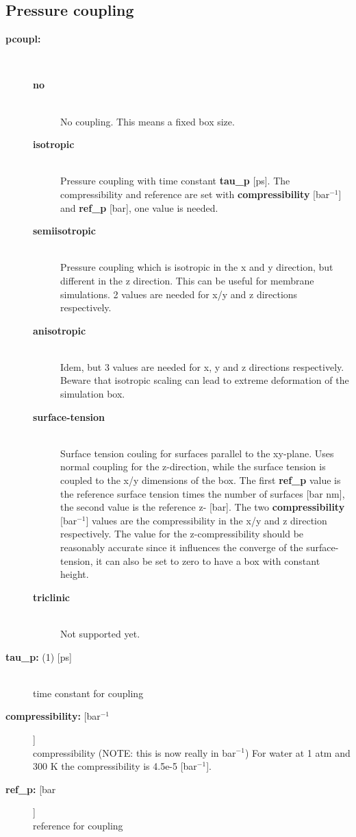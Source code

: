 \subsection{Pressure coupling}
\begin{description}
\item[{\bf pcoupl:}]\mbox{}\\
\vspace{-2ex}\begin{description}
\item[{\bf no}]\mbox{}\\
No  coupling. This means a fixed box size.
\item[{\bf isotropic}]\mbox{}\\
Pressure coupling with time constant {\bf tau\_p} [ps].
The compressibility and reference  are set with
{\bf compressibility} [bar$^{-1}$] and {\bf ref\_p} [bar], one
value is needed.
\item[{\bf semiisotropic}]\mbox{}\\
Pressure coupling which is isotropic in the x and y direction,
but different in the z direction.
This can be useful for membrane simulations.
2 values are needed for x/y and z directions respectively.
\item[{\bf anisotropic}]\mbox{}\\
Idem, but 3 values are needed for x, y and z directions respectively.
Beware that isotropic scaling can lead to extreme deformation
of the simulation box.
\item[{\bf surface-tension}]\mbox{}\\
Surface tension couling for surfaces parallel to the xy-plane.
Uses normal  coupling for the z-direction, while the surface tension
is coupled to the x/y dimensions of the box.
The first {\bf ref\_p} value is the reference surface tension times
the number of surfaces [bar nm], 
the second value is the reference z- [bar].
The two {\bf compressibility} [bar$^{-1}$] values are the compressibility
in the x/y and z direction respectively.
The value for the z-compressibility should be reasonably accurate since it
influences the converge of the surface-tension, it can also be set to zero
to have a box with constant height.
\item[{\bf triclinic}]\mbox{}\\
Not supported yet.
\end{description}
\item[{\bf tau\_p: }(1) {[ps]}]\mbox{}\\
time constant for coupling
\item[{\bf compressibility: }[bar$^{-1}$]]\mbox{}\\
compressibility (NOTE: this is now really in bar$^{-1}$)
For water at 1 atm and 300 K the compressibility is 4.5e-5 [bar$^{-1}$].
\item[{\bf ref\_p: }[bar]]\mbox{}\\
reference  for coupling
\end{description}

